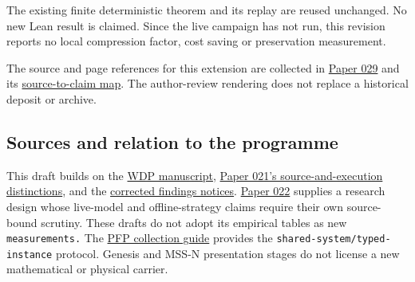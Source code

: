 \documentclass[
  11pt,
]{article}
\begin{document}
The existing finite deterministic theorem and its replay are reused
unchanged. No new Lean result is claimed. Since the live campaign has
not run, this revision reports no local compression factor, cost saving
or preservation measurement.

The source and page references for this extension are collected in
\href{../029/paper.pdf}{Paper 029} and its
\href{../029/docs/source_to_claim_map.md}{source-to-claim map}. The
author-review rendering does not replace a historical deposit or
archive.

\subsection{Sources and relation to the
programme}\label{sources-and-relation-to-the-programme}

This draft builds on the
\href{https://github.com/dbccpage/the_symbol_game/blob/59dde95a7860063c25d75db37f40af556e9f28ee/atlas/coda_atlas/F004_papers/001_finite_obstruction_calculus/000_witnessed_difference_programme/witnessed_difference_programme.md}{WDP
manuscript},
\href{https://github.com/dbccpage/the_symbol_game/blob/59dde95a7860063c25d75db37f40af556e9f28ee/atlas/coda_atlas/F004_papers/015_pfp/021_recreated_demos_and_proposal_fidelity_evidence/paper.md}{Paper
021's source-and-execution distinctions}, and the
\href{https://github.com/dbccpage/the_symbol_game/blob/59dde95a7860063c25d75db37f40af556e9f28ee/atlas/coda_atlas/F004_papers/015_pfp/symbol_game_challenge_and_demos_findings/README.md}{corrected
findings notices}.
\href{https://github.com/dbccpage/the_symbol_game/blob/59dde95a7860063c25d75db37f40af556e9f28ee/atlas/coda_atlas/F004_papers/015_pfp/022_pfp_frontier_research/paper.md}{Paper
022} supplies a research design whose live-model and offline-strategy
claims require their own source-bound scrutiny. These drafts do not
adopt its empirical tables as new \nolinkurl{measurements.} The
\href{https://github.com/dbccpage/the_symbol_game/blob/59dde95a7860063c25d75db37f40af556e9f28ee/atlas/coda_atlas/F004_papers/015_pfp/README.md}{PFP
collection guide} provides the \nolinkurl{shared-system/typed-instance}
protocol. Genesis and MSS-N presentation stages do not license a new
mathematical or physical carrier.
\end{document}
